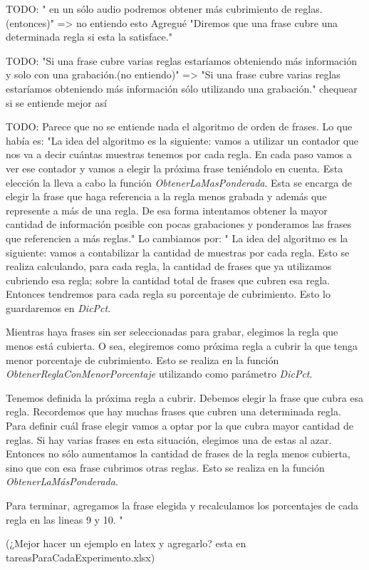 TODO: " en un sólo audio podremos obtener más cubrimiento de reglas.(entonces)" => no entiendo esto
Agregué "Diremos que una frase cubre una determinada regla si esta la satisface."

TODO: "Si una frase cubre varias reglas estaríamos obteniendo más información y solo con una grabación.(no entiendo)" => "Si una frase cubre varias reglas estaríamos obteniendo más información sólo utilizando una grabación." chequear si se entiende mejor así

TODO: Parece que no se entiende nada el algoritmo de orden de frases. Lo que había es:
"La idea del algoritmo es la siguiente: vamos a utilizar un contador que nos va a decir cuántas muestras tenemos por cada regla. En cada paso vamos a ver ese contador y vamos a elegir la próxima frase teniéndolo en cuenta. Esta elección la lleva a cabo la función \textit{ObtenerLaMasPonderada}. Esta se encarga de elegir la frase que haga referencia a la regla menos grabada y además que represente a más de una regla. De esa forma intentamos obtener la mayor cantidad de información posible con pocas grabaciones y ponderamos las frases que referencien a más reglas."
Lo cambiamos por:
"
La idea del algoritmo es la siguiente: vamos a contabilizar la cantidad de muestras por cada regla. Esto se realiza calculando, para cada regla, la cantidad de frases que ya utilizamos cubriendo esa regla; sobre la cantidad total de frases que cubren esa regla. Entonces tendremos para cada regla su porcentaje de cubrimiento. Esto lo guardaremos en \textit{DicPct}.

Mientras haya frases sin ser seleccionadas para grabar, elegimos la regla que menos está cubierta. O sea, elegiremos como próxima regla a cubrir la que tenga menor porcentaje de cubrimiento. Esto se realiza en la función \textit{ObtenerReglaConMenorPorcentaje} utilizando como parámetro \textit{DicPct}.

Tenemos definida la próxima regla a cubrir. Debemos elegir la frase que cubra esa regla. Recordemos que hay muchas frases que cubren una determinada regla. Para definir cuál frase elegir vamos a optar por la que cubra mayor cantidad de reglas. Si hay varias frases en esta situación, elegimos una de estas al azar. Entonces no sólo aumentamos la cantidad de frases de la regla menos cubierta, sino que con esa frase cubrimos otras reglas. Esto se realiza en la función \textit{ObtenerLaMásPonderada}.

Para terminar, agregamos la frase elegida y recalculamos los porcentajes de cada regla en las lineas 9 y 10.
"

(¿Mejor hacer un ejemplo en latex y agregarlo? esta en tareasParaCadaExperimento.xlsx) 

